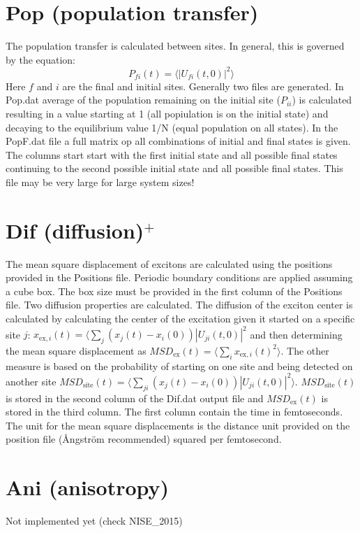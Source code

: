 \section{Pop (population transfer)}
The population transfer is calculated between sites. In general, this is governed by the equation:
\begin{equation}
P_{fi}(t)=\langle |U_{fi}(t,0)|^2 \rangle
\end{equation}
Here $f$ and $i$ are the final and initial sites. Generally two files are generated. In Pop.dat average of the population remaining on the initial site ($P_{ii}$) is calculated resulting in a value starting at 1 (all popiulation is on the initial state) and decaying to the equilibrium value 1/N (equal population on all states). In the PopF.dat file a full matrix op all combinations of initial and final states is given. The columns start start with the first initial state and all possible final states continuing to the second possible initial state and all possible final states. This file may be very large for large system sizes!
\section{Dif (diffusion)$^{+}$}
The mean square displacement of excitons are calculated using the positions provided in the Positions file. Periodic boundary conditions are applied assuming a cube box. The box size must be provided in the first column of the Positions file.
Two diffusion properties are calculated. The diffusion of the exciton center is calculated by calculating the center of the excitation given it started on a specific site $j$: $x_{\textrm{ex},i}(t)=\langle \sum_j (x_j(t)-x_i(0)) |U_{ji}(t,0)|^2$ and then determining the mean square displacement as $MSD_{\textrm{ex}}(t)=\langle \sum_i  x_{\textrm{ex},i}(t)^2\rangle$. The other measure is based on the probability of starting on one site and being detected on another site $MSD_{\textrm{site}}(t)=\langle \sum_{ji} (x_j(t)-x_i(0))|U_{ji}(t,0)|^2\rangle$. $MSD_{\textrm{site}}(t)$ is stored in the second column of the Dif.dat output file and $MSD_{\textrm{ex}}(t)$ is stored in the third column. The first column contain the time in femtoseconds. The unit for the mean square displacements is the distance unit provided on the position file (\AA ngstr\"{o}m recommended) squared per femtosecond. 
\section{Ani (anisotropy)}
Not implemented yet (check NISE\_2015)
